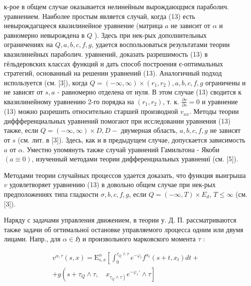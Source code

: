 \documentclass[10pt]{article}
\begin{document}
к-рое в общем случае оказывается нелинейным вырождаюццмся параболич. уравнением. Наиболее простым является случай, когда (13) есть невырождагщееся квазилинейное уравнение (матрица $a$ не зависит от $\alpha$ и равномерно невырождена в $Q$ ). Здесь при нек-рых дополнительных ограничениях на $Q, a, b, c, f, g$, удается воспользоваться результатами теории квазилинейных параболич. уравнений, доказать разрешимость (13) в гёльдеровских классах функций и дать способ построения є-оптимальных стратегий, основанный на решении уравнений (13). Аналогичный подход используется (см. [3]), когда $Q=(-\infty, \infty) \times\left(r_{1}, r_{2}\right), a, b, c, f, g$ ограничены и не зависят от $s, a$ - равномерно отделена от нуля. В этом случае (13) сводится к квазилинейному уравнению 2-го порядка на $\left(r_{1}, r_{2}\right)$, т. к. $\frac{\partial v}{\partial s}=0$ и уравнение (13) можно разрешить относительно старшей производной $v_{x x}$. Методы теории диффференциальных уравнений помогают при исследовании уравнения (13) также, если $Q=(-\infty, \infty) \times D, D-$ двумерная область, $a, b, c, f, g$ не зависят от $s$ (см. лит. в [3]). Здесь, как и в предыдущем случае, допускается зависимость $a$ от $\alpha$. Уместно упомянуть также случай уравнений Гамильтона - Якоби $(a \equiv 0)$, изученный методами теории дифференциальных уравнениї (см. [5]).



Методами теории случайных процессов удается доказать, что функция выигрыша $v$ удовлетворяет уравнению (13) в довольно общем случае при нек-рых предположениях типа гладкости $\sigma, b, c, f, g$, если $Q=(-\infty, T) \times E_{d}$, $T \leqslant \infty$ (см. [3]).



Наряду с задачами управления движением, в теории у. Д. П. рассматриваются также задачи об огтимальної остановке управляемого лроцесса одним или двумя лицами. Напр., для $\alpha \in \mathfrak{H}$ и произвольного марковского момента $\tau$ :



\[

\begin{gathered}

v^{\alpha, \tau}(s, x)=\mathrm{E}_{s, x}^{\alpha}\left[\int_{0}^{\tau_{Q} \wedge \tau} e^{-\varphi_{t}} f^{\alpha_{t}}\left(s+t, x_{t}\right) d t+\right. \\

+g\left(s+\tau_{Q} \wedge \tau, \quad x_{\left.\tau_{Q} \wedge \tau\right)} e^{-\varphi_{\tau}}{ }^{\prime} \wedge \tau\right]

\end{gathered}

\]
\end{document}
